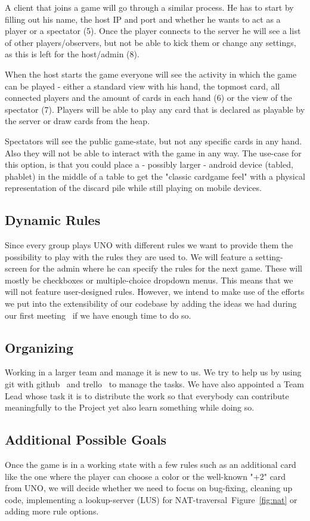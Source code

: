 \documentclass{sig-alternate}
\newcommand{\rfig}[1]{Figure~\ref{fig:#1}}
\begin{document}
A client that joins a game will go through a similar process. He has to start by filling out his name, the host IP and port and whether he wants to act as a player or a spectator (5). Once the player connects to the server he will see a list of other players/observers, but not be able to kick them or change any settings, as this is left for the host/admin (8). 

When the host starts the game everyone will see the activity in which the game can be played - either a standard view with his hand, the topmost card, all connected players and the amount of cards in each hand (6) or the view of the spectator (7). Players will be able to play any card that is declared as playable by the server or draw cards from the heap.

Spectators will see the public game-state, but not any specific cards in any hand. Also they will not be able to interact with the game in any way. The use-case for this option, is that you could place a - possibly larger - android device (tabled, phablet) in the middle of a table to get the "classic cardgame feel" with a physical representation of the discard pile while still playing on mobile devices. 

\subsection{Dynamic Rules}
Since every group plays UNO with different rules we want to provide them the possibility to play with the rules they are used to. We will feature a setting-screen for the admin where he can specify the rules for the next game. These will mostly be checkboxes or multiple-choice dropdown menus. This means that we will not feature user-designed rules. However, we intend to make use of the efforts we put into the extensibility of our codebase by adding the ideas we had during our first meeting~\cite{firstprotocol} if we have enough time to do so.

\subsection{Organizing}
Working in a larger team and manage it is new to us. We try to help us by using git with github~\cite{github} and trello~\cite{trello} to manage the tasks. We have also appointed a Team Lead whose task it is to distribute the work so that everybody can contribute meaningfully to the Project yet also learn something while doing so. 

\subsection{Additional Possible Goals}
Once the game is in a working state with a few rules such as an additional card like the one where the player can choose a color or the well-known "+2" card from UNO, we will decide whether we need to focus on bug-fixing, cleaning up code, implementing a lookup-server (LUS) for NAT-traversal~\rfig{nat} or adding more rule options. 
\end{document}
